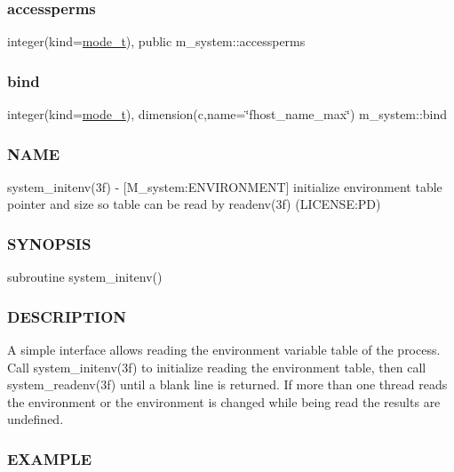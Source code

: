 \subsubsection{\texorpdfstring{accessperms}{accessperms}}
{\footnotesize\ttfamily integer(kind=\mbox{\hyperlink{namespacem__system_abdb5cc27c945379d844db4830d499050}{mode\+\_\+t}}), public m\+\_\+system\+::accessperms}

\mbox{\label{namespacem__system_a7d597052e9d23e2d899e6f81a4509c70}} 
\subsubsection{\texorpdfstring{bind}{bind}}
{\footnotesize\ttfamily integer(kind=\mbox{\hyperlink{namespacem__system_abdb5cc27c945379d844db4830d499050}{mode\+\_\+t}}), dimension(c,name=\char`\"{}fhost\+\_\+name\+\_\+max\char`\"{}) m\+\_\+system\+::bind\hspace{0.3cm}{\ttfamily [private]}}



\subsubsection*{N\+A\+ME}

system\+\_\+initenv(3f) -\/ \mbox{[}M\+\_\+system\+:E\+N\+V\+I\+R\+O\+N\+M\+E\+NT\mbox{]} initialize environment table pointer and size so table can be read by readenv(3f) (L\+I\+C\+E\+N\+SE\+:PD) \subsubsection*{S\+Y\+N\+O\+P\+S\+IS}

subroutine system\+\_\+initenv() \subsubsection*{D\+E\+S\+C\+R\+I\+P\+T\+I\+ON}

A simple interface allows reading the environment variable table of the process. Call system\+\_\+initenv(3f) to initialize reading the environment table, then call system\+\_\+readenv(3f) until a blank line is returned. If more than one thread reads the environment or the environment is changed while being read the results are undefined.

\subsubsection*{E\+X\+A\+M\+P\+LE}

